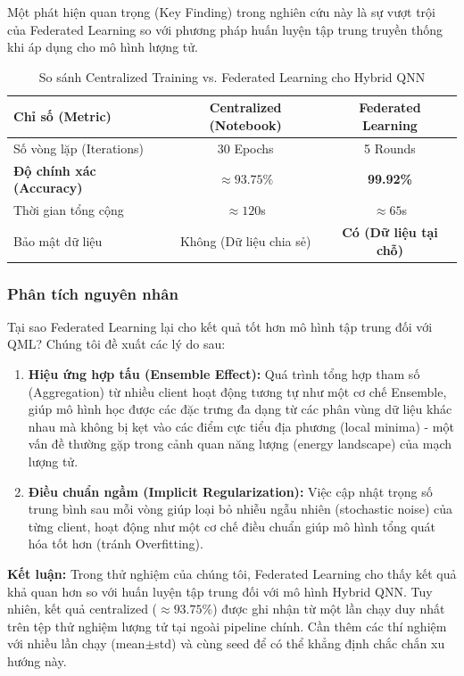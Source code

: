 Một phát hiện quan trọng (Key Finding) trong nghiên cứu này là sự vượt trội của Federated Learning so với phương pháp huấn luyện tập trung truyền thống khi áp dụng cho mô hình lượng tử.

\begin{table}[ht!]
\centering
\caption{So sánh Centralized Training vs. Federated Learning cho Hybrid QNN}
\label{tab:centralized_vs_fl}
\begin{tabular}{|l|c|c|}
\hline
\textbf{Chỉ số (Metric)} & \textbf{Centralized (Notebook)} & \textbf{Federated Learning} \\ \hline
Số vòng lặp (Iterations) & 30 Epochs & 5 Rounds \\ \hline
\textbf{Độ chính xác (Accuracy)} & $\approx 93.75\%$ & \textbf{99.92\%} \\ \hline
Thời gian tổng cộng & $\approx 120$s & $\approx 65$s \\ \hline
Bảo mật dữ liệu & Không (Dữ liệu chia sẻ) & \textbf{Có (Dữ liệu tại chỗ)} \\ \hline
\end{tabular}
\end{table}

\subsubsection{Phân tích nguyên nhân}
Tại sao Federated Learning lại cho kết quả tốt hơn mô hình tập trung đối với QML? Chúng tôi đề xuất các lý do sau:
\begin{enumerate}
    \item \textbf{Hiệu ứng hợp tấu (Ensemble Effect):} Quá trình tổng hợp tham số (Aggregation) từ nhiều client hoạt động tương tự như một cơ chế Ensemble, giúp mô hình học được các đặc trưng đa dạng từ các phân vùng dữ liệu khác nhau mà không bị kẹt vào các điểm cực tiểu địa phương (local minima) - một vấn đề thường gặp trong cảnh quan năng lượng (energy landscape) của mạch lượng tử.
    \item \textbf{Điều chuẩn ngầm (Implicit Regularization):} Việc cập nhật trọng số trung bình sau mỗi vòng giúp loại bỏ nhiễu ngẫu nhiên (stochastic noise) của từng client, hoạt động như một cơ chế điều chuẩn giúp mô hình tổng quát hóa tốt hơn (tránh Overfitting).
\end{enumerate}

\textbf{Kết luận:} Trong thử nghiệm của chúng tôi, Federated Learning cho thấy kết quả khả quan hơn so với huấn luyện tập trung đối với mô hình Hybrid QNN. Tuy nhiên, kết quả centralized ($\approx 93.75\%$) được ghi nhận từ một lần chạy duy nhất trên tệp thử nghiệm lượng tử tại  ngoài pipeline chính. Cần thêm các thí nghiệm với nhiều lần chạy (mean$\pm$std) và cùng seed để có thể khẳng định chắc chắn xu hướng này.

